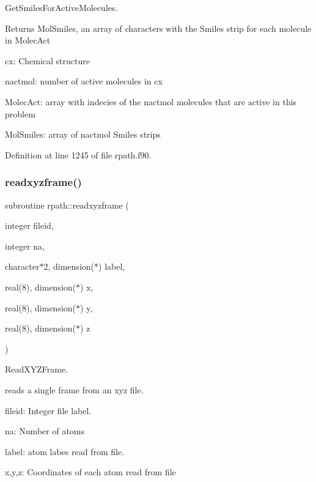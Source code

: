 Get\+Smiles\+For\+Active\+Molecules. 

Returns Mol\+Smiles, an array of characters with the Smiles strip for each molecule in Molec\+Act


\begin{DoxyItemize}
\item cx\+: Chemical structure
\item nactmol\+: number of active molecules in cx
\item Molec\+Act\+: array with indecies of the nactmol molecules that are active in this problem
\item Mol\+Smiles\+: array of nactmol Smiles strips 
\end{DoxyItemize}

Definition at line 1245 of file rpath.\+f90.

\mbox{\label{namespacerpath_aba836ec30e7b0733327d8f2949e4b00c}} 
\subsubsection{\texorpdfstring{readxyzframe()}{readxyzframe()}}
{\footnotesize\ttfamily subroutine rpath\+::readxyzframe (\begin{DoxyParamCaption}\item[{integer}]{fileid,  }\item[{integer}]{na,  }\item[{character$\ast$2, dimension($\ast$)}]{label,  }\item[{real(8), dimension($\ast$)}]{x,  }\item[{real(8), dimension($\ast$)}]{y,  }\item[{real(8), dimension($\ast$)}]{z }\end{DoxyParamCaption})}



Read\+X\+Y\+Z\+Frame. 

reads a single frame from an xyz file.


\begin{DoxyItemize}
\item fileid\+: Integer file label.
\item na\+: Number of atoms
\item label\+: atom labes read from file.
\item x,y,z\+: Coordinates of each atom read from file 
\end{DoxyItemize}

